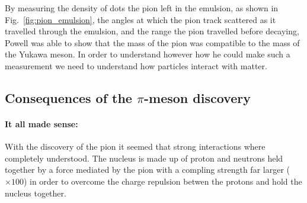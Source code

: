 By measuring the density of dots the pion left in the emulsion, as shown in Fig.~\ref{fig:pion_emulsion}, the angles at which the pion track scattered as it travelled through the emulsion, and the range the pion travelled before decaying, Powell was able to show that the mass of the pion was compatible to the mass of the Yukawa meson. In order to understand however how he could make such a measurement we need to understand how particles interact with matter.
\clearpage


\subsection{Consequences of the $\pi$-meson discovery}
\label{sec:isospinProtonsNeutronsPions}

\paragraph{It all made sense:} With the discovery of the pion it seemed that
strong interactions where completely understood. The nucleus is made up of proton and neutrons held together by a force mediated by the pion with a compling strength far larger ($\times 100$) in order to overcome the charge repulsion betwen the protons and hold the nucleus together.

